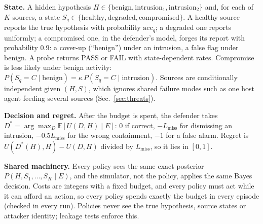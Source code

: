 \documentclass[conference]{IEEEtran}
\begin{document}
\textbf{State.} A hidden hypothesis $H\in\{\text{benign},\text{intrusion}_1,\text{intrusion}_2\}$ and, for each of $K$
sources, a state $S_q\in\{\text{healthy},\text{degraded},\text{compromised}\}$. A healthy source reports the true
hypothesis with probability $\mathrm{acc}_q$; a degraded one reports uniformly; a compromised one, in the defender's
model, forges its report with probability 0.9: a cover-up (``benign'') under an intrusion, a false flag under benign. A
probe returns PASS or FAIL with state-dependent rates. Compromise is less likely under benign activity:
$P(S_q{=}C\mid\text{benign})=\kappa\,P(S_q{=}C\mid\text{intrusion})$. Sources are conditionally independent given $(H,S)$,
which ignores shared failure modes such as one host agent feeding several sources (Sec.~\ref{sec:threats}).

\textbf{Decision and regret.} After the budget is spent, the defender takes $D^*=\arg\max_D\mathbb{E}[U(D,H)\mid E]$:
0 if correct, $-L_{\text{miss}}$ for dismissing an intrusion, $-0.5L_{\text{miss}}$ for the wrong containment, $-1$ for
a false alarm. Regret is $U(D^*(H),H)-U(D,H)$ divided by $L_{\text{miss}}$, so it lies in $[0,1]$.

\textbf{Shared machinery.} Every policy sees the same exact posterior $P(H,S_1,\dots,S_K\mid E)$, and the simulator, not
the policy, applies the same Bayes decision. Costs are integers with a fixed budget, and every policy must act while it
can afford an action, so every policy spends exactly the budget in every episode (checked in every run). Policies never
see the true hypothesis, source states or attacker identity; leakage tests enforce this.
\end{document}
